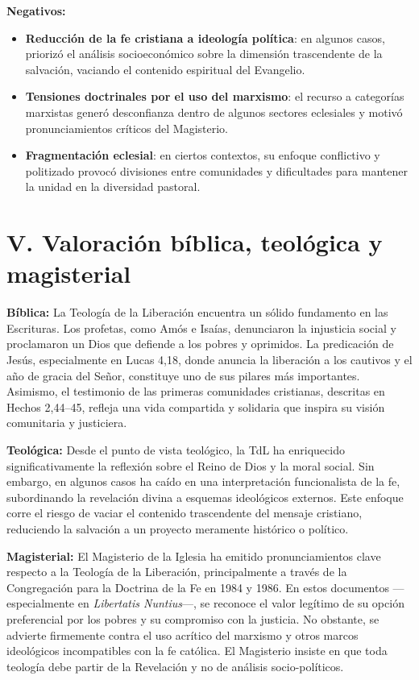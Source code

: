 \documentclass[12pt]{article}
\begin{document}
\textbf{Negativos:}
\begin{itemize}
    \item \textbf{Reducción de la fe cristiana a ideología política}: en algunos casos, priorizó el análisis socioeconómico sobre la dimensión trascendente de la salvación, vaciando el contenido espiritual del Evangelio.
    \item \textbf{Tensiones doctrinales por el uso del marxismo}: el recurso a categorías marxistas generó desconfianza dentro de algunos sectores eclesiales y motivó pronunciamientos críticos del Magisterio.
    \item \textbf{Fragmentación eclesial}: en ciertos contextos, su enfoque conflictivo y politizado provocó divisiones entre comunidades y dificultades para mantener la unidad en la diversidad pastoral.
\end{itemize}

\section*{V. Valoración bíblica, teológica y magisterial}
\textbf{Bíblica:} La Teología de la Liberación encuentra un sólido fundamento en las Escrituras. Los profetas, como Amós e Isaías, denunciaron la injusticia social y proclamaron un Dios que defiende a los pobres y oprimidos. La predicación de Jesús, especialmente en Lucas 4,18, donde anuncia la liberación a los cautivos y el año de gracia del Señor, constituye uno de sus pilares más importantes. Asimismo, el testimonio de las primeras comunidades cristianas, descritas en Hechos 2,44–45, refleja una vida compartida y solidaria que inspira su visión comunitaria y justiciera.

\textbf{Teológica:} Desde el punto de vista teológico, la TdL ha enriquecido significativamente la reflexión sobre el Reino de Dios y la moral social. Sin embargo, en algunos casos ha caído en una interpretación funcionalista de la fe, subordinando la revelación divina a esquemas ideológicos externos. Este enfoque corre el riesgo de vaciar el contenido trascendente del mensaje cristiano, reduciendo la salvación a un proyecto meramente histórico o político.

\textbf{Magisterial:} El Magisterio de la Iglesia ha emitido pronunciamientos clave respecto a la Teología de la Liberación, principalmente a través de la Congregación para la Doctrina de la Fe en 1984 y 1986. En estos documentos —especialmente en \textit{Libertatis Nuntius}—, se reconoce el valor legítimo de su opción preferencial por los pobres y su compromiso con la justicia. No obstante, se advierte firmemente contra el uso acrítico del marxismo y otros marcos ideológicos incompatibles con la fe católica. El Magisterio insiste en que toda teología debe partir de la Revelación y no de análisis socio-políticos.
\end{document}
